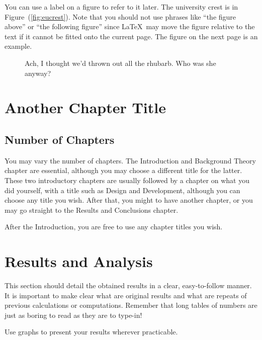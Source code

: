 \documentclass[12pt,a4paper]{report}
\begin{document}
You can use a label on a figure to refer to it later. The university
crest is in Figure~(\ref{fig:eucrest}). Note that you should not use
phrases like ``the figure above'' or ``the following figure'' since
\LaTeX\ may move the figure relative to the text if it cannot be fitted
onto the current page. The figure on the next page is an example.

\begin{figure}

\begin{center}
\end{center}

\caption{Ach, I thought we'd thrown out all the rhubarb. Who was she
  anyway?}
\label{fig:rhubarbtruss}

\end{figure}


\chapter{Another Chapter Title}
\section{Number of Chapters}

You may vary the number of chapters. The Introduction and Background
Theory chapter are essential, although you may choose a different
title for the latter. These two introductory chapters are usually
followed by a chapter on what you did yourself, with a title such as
Design and Development, although you can choose any title you
wish. After that, you might to have another chapter, or you may go
straight to the Results and Conclusions chapter.

After the Introduction, you are free to use any chapter titles you wish.




\chapter{Results and Analysis}

This section should detail the obtained results in a clear,
easy-to-follow manner. It is important to make clear what are original
results and what are repeats of previous calculations or computations.
Remember that long tables of numbers are just as boring to read as
they are to type-in!

Use graphs to present your results wherever practicable.
\end{document}
